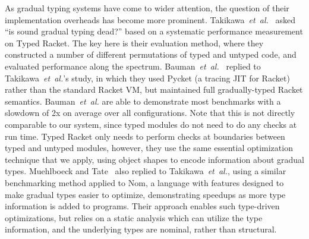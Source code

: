 As gradual typing systems have come to wider attention, the question of their
implementation overheads has become more prominent.  
Takikawa~\textit{et~al.}~\cite{Takikawa2016} asked ``is sound gradual typing
dead?'' based on a systematic performance measurement on Typed Racket.
The key here is their evaluation method, where they constructed a
number of different permutations of typed and untyped code, and
evaluated performance along the spectrum.
Bauman~\textit{et~al.}~\cite{Bauman2017} replied to Takikawa~\textit{et~al.}'s study, in which they used Pycket\citep{Pycket2015} (a tracing JIT for Racket)
rather than the standard Racket VM,
but maintained full gradually-typed Racket semantics.
Bauman~\textit{et~al.} are able to demonstrate most benchmarks
with a slowdown of 2x on average over all configurations.
Note that this is not directly comparable to our system,
since typed modules do not need to do any checks at run time.
Typed Racket only needs to perform checks at boundaries between typed and untyped modules,
however, they use the same essential optimization technique that we apply,
using object shapes to encode information about gradual types.
Muehlboeck and Tate~\cite{Muehlboeck2017} also replied to
Takikawa~\textit{et~al.}, using a similar benchmarking method applied
to Nom, a language with features designed to make gradual types easier
to optimize, demonstrating speedups as more type information is added
to programs.  Their approach enables such type-driven optimizations,
but relies on a static analysis which can utilize the type
information, and the underlying types are nominal, rather than
structural.



